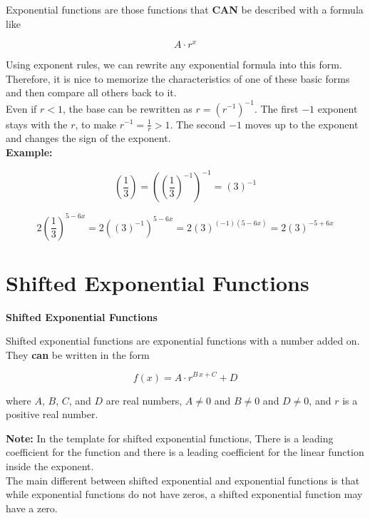 \documentclass{ximera}
\begin{document}
Exponential functions are those functions that \textbf{\textcolor{purple!85!blue}{CAN}} be described with a formula like 

\[
A \cdot r^x
\]

Using exponent rules, we can rewrite any exponential formula into this form.  Therefore, it is nice to memorize the characteristics of one of these basic forms and then compare all others back to it. \\




Even if $r<1$, the base can be rewritten as $r = (r^{-1})^{-1}$. The first $-1$ exponent stays with the $r$, to make $r^{-1}= \frac{1}{r} > 1$.  The second $-1$ moves up to the exponent and changes the sign of the exponent.\\


\textbf{Example:}  

\[
\left( \frac{1}{3} \right) = \left( \left( \frac{1}{3} \right)^{-1} \right)^{-1} = ( 3 )^{-1}
\]

\[
2 \left( \frac{1}{3} \right)^{5-6x} = 2 \left( ( 3 )^{-1} \right)^{5-6x} = 2 (3)^{(-1)(5-6x)} =  2 (3)^{-5+6x}
\]






\section*{Shifted Exponential Functions}


\begin{definition} \textbf{\textcolor{green!50!black}{Shifted Exponential Functions}}

Shifted exponential functions are exponential functions with a number added on.  They \textbf{\textcolor{purple!85!blue}{can}} be written in the form


\[      f(x) = A \cdot r^{B \, x + C} + D   \]

where $A$, $B$, $C$, and $D$ are real numbers, $A \ne 0$ and $B \ne 0$ and $D \ne 0$, and $r$ is a positive real number.


\end{definition}

\textbf{Note:}  In the template for shifted exponential functions, There is a leading coefficient for the function and there is a leading coefficient for the linear function inside the exponent. \\


The main different between shifted exponential and exponential functions is that while exponential functions do not have zeros, a shifted exponential function may have a zero. \\
\end{document}

